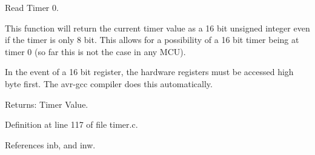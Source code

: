Read Timer 0. 

This function will return the current timer value as a 16 bit unsigned integer even if the timer is only 8 bit. This allows for a possibility of a 16 bit timer being at timer 0 (so far this is not the case in any MCU).

In the event of a 16 bit register, the hardware registers must be accessed high byte first. The avr-gcc compiler does this automatically.

\begin{Desc}
\item[Returns:]Timer Value. \end{Desc}


Definition at line 117 of file timer.c.

References inb, and inw.